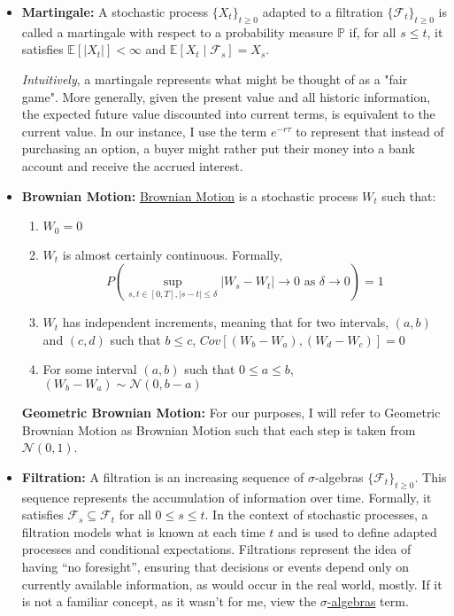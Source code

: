 \documentclass[titlepage]{article}
\begin{document}
\begin{itemize}

    \item \textbf{Martingale:} \label{sec:martingales} A stochastic process $\{X_t\}_{t \geq 0}$ adapted to a filtration $\{\mathcal{F}_t\}_{t \geq 0}$ is called a martingale with respect to a probability measure $\mathbb{P}$ if, for all $s \leq t$, it satisfies $\mathbb{E}[|X_t|] < \infty$ and $\mathbb{E}[X_t \mid \mathcal{F}_s] = X_s$. 
    \par \quad \textit{Intuitively}, a martingale represents what might be thought of as a "fair game". More generally, given the present value and all historic information, the expected future value discounted into current terms, is equivalent to the current value. In our instance, I use the term $e^{-r \tau}$ to represent that instead of purchasing an option, a buyer might rather put their money into a bank account and receive the accrued interest.

    \item \textbf{Brownian Motion:} \label{sec:BM} 
    \href{https://en.wikipedia.org/wiki/Brownian_motion#Mathematics}{Brownian Motion} is a stochastic process $W_t$ such that:
    \begin{enumerate}
        \item $W_0 = 0$
        \item $W_t$ is almost certainly continuous. Formally, 
        \[P\left( \sup_{s,t \in [0,T], |s-t| \leq \delta} |W_s - W_t| \to 0 \text{ as } \delta \to 0 \right) = 1\]
        \item $W_t$ has independent increments, meaning that for two intervals, $(a,b)$ and $(c,d)$ such that $b\leq c$, $ Cov\left[ (W_b - W_a), (W_d - W_c) \right] = 0 $
        \item For some interval $(a,b)$ such that $0\leq a \leq b$, $(W_b - W_a) \sim \mathcal{N}(0,b-a)$
    \end{enumerate}
    \quad \textbf{Geometric Brownian Motion:} \label{sec:GBM} For our purposes, I will refer to Geometric Brownian Motion as Brownian Motion such that each step is taken from $\mathcal{N}(0,1)$.
    
    \item \textbf{Filtration:} \label{sec:filtration} A filtration is an increasing sequence of $\sigma$-algebras $\{\mathcal{F}_t\}_{t \geq 0}$. This sequence represents the accumulation of information over time. Formally, it satisfies $\mathcal{F}_s \subseteq \mathcal{F}_t$ for all $0 \leq s \leq t$. In the context of stochastic processes, a filtration models what is known at each time $t$ and is used to define adapted processes and conditional expectations. Filtrations represent the idea of having “no foresight”, ensuring that decisions or events depend only on currently available information, as would occur in the real world, mostly. If it is not a familiar concept, as it wasn't for me, view the \hyperref[sec:sigma]{$\sigma$-algebras} term.


\end{itemize}
\end{document}

